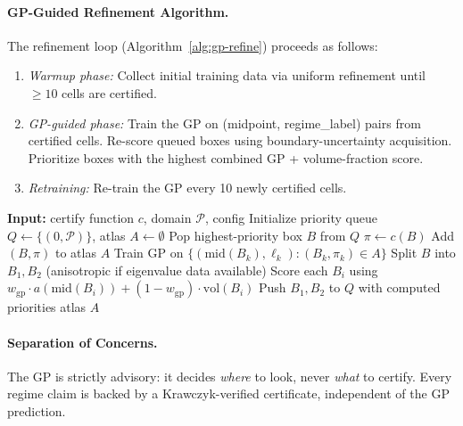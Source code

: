 \documentclass[11pt]{article}
\begin{document}
\paragraph{GP-Guided Refinement Algorithm.}
The refinement loop (Algorithm~\ref{alg:gp-refine}) proceeds as follows:
\begin{enumerate}
\item \emph{Warmup phase:} Collect initial training data via uniform refinement until $\geq 10$ cells are certified.
\item \emph{GP-guided phase:} Train the GP on (midpoint, regime\_label) pairs from certified cells. Re-score queued boxes using boundary-uncertainty acquisition. Prioritize boxes with the highest combined GP + volume-fraction score.
\item \emph{Retraining:} Re-train the GP every 10 newly certified cells.
\end{enumerate}

\begin{algorithm}[t]
\caption{GP-Guided Adaptive Refinement}
\label{alg:gp-refine}
\begin{algorithmic}[1]
\State \textbf{Input:} certify function $c$, domain $\mathcal{P}$, config
\State Initialize priority queue $Q \leftarrow \{(0, \mathcal{P})\}$, atlas $A \leftarrow \emptyset$
  \State Pop highest-priority box $B$ from $Q$
  \State $\pi \leftarrow c(B)$ 
    \State Add $(B, \pi)$ to atlas $A$
      \State Train GP on $\{(\mathrm{mid}(B_k), \ell_k) : (B_k, \pi_k) \in A\}$
    \EndIf
  \Else
    \State Split $B$ into $B_1, B_2$ (anisotropic if eigenvalue data available)
    \State Score each $B_i$ using $w_{\mathrm{gp}} \cdot a(\mathrm{mid}(B_i)) + (1 - w_{\mathrm{gp}}) \cdot \mathrm{vol}(B_i)$
    \State Push $B_1, B_2$ to $Q$ with computed priorities
  \EndIf
\EndWhile
\State \Return atlas $A$
\end{algorithmic}
\end{algorithm}

\paragraph{Separation of Concerns.}
The GP is strictly advisory: it decides \emph{where} to look, never \emph{what} to certify.
Every regime claim is backed by a Krawczyk-verified certificate, independent of the GP prediction.
\end{document}
